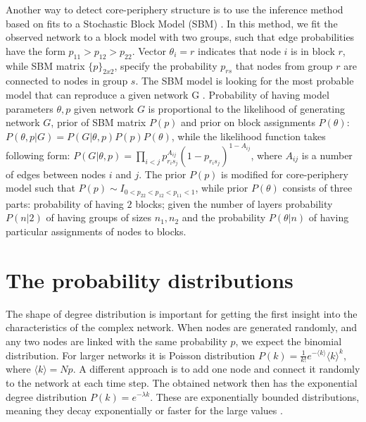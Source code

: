 
Another way to detect core-periphery structure is to use the inference method based on fits to a Stochastic Block Model (SBM) \cite{zhang2015identification, karrer2011stochastic}. In this method, we fit the observed network to a block model with two groups, such that edge probabilities have the form $p_{11}> p_{12} > p_{22}$. Vector $\theta_i = r$ indicates that node $i$ is in block $r$, while SBM matrix $\{p\}_{2x2}$, specify the probability $p_{rs}$ that nodes from group $r$ are connected to nodes in group $s$. The SBM model is looking for the most probable model that can reproduce a given network G \cite{gallagher2020clarified}. 
Probability of having model parameters $\theta, p$ given network $G$ is proportional to the likelihood of generating network $G$, prior of SBM matrix $P(p)$ and prior on block assignments $P(\theta)$: $P(\theta, p| G) = P(G | \theta , p) P(p) P(\theta)$, while the likelihood function takes following form: $P(G | \theta , p) = \prod_{i<j} p_{r_is_j}^{A_{ij}}(1-p_{r_is_j})^{1-A_{ij}}$, where $A_{ij}$ is a number of edges between nodes $i$ and $j$. The prior $P(p)$ is modified for core-periphery model such that $P(p)  \sim I_{0<p_{22}<p_{12}<p_{11}<1}$, while prior  $P(\theta) $ consists of three parts: probability of having $2$ blocks; given the number of layers probability $P(n|2)$ of having groups of sizes ${n_1, n_2}$ and the probability $P(\theta|n)$ of having particular assignments of nodes to blocks. 

\section{The probability distributions}

The shape of degree distribution is important for getting the first insight into the characteristics of the complex network. When nodes are generated randomly, and any two nodes are linked with the same probability $p$,  we expect the binomial distribution. For larger networks it is Poisson distribution $P(k) = \frac{1}{k!}e^{-\langle k \rangle}\langle k \rangle^{k}$, where $\langle k \rangle = Np$. A different approach is to add one node and connect it randomly to the network at each time step. The obtained network then has the exponential degree distribution $P(k)=e^{-\lambda k}$. These are exponentially bounded distributions, meaning they decay exponentially or faster for the large values \cite{barabasi2016network}. 


